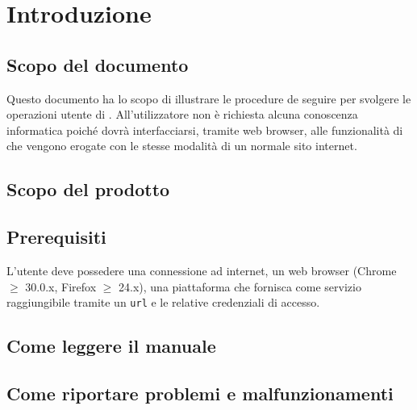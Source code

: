 \section{Introduzione}


\subsection{Scopo del documento}
Questo documento ha lo scopo di illustrare le procedure de seguire per svolgere le operazioni utente di . All'utilizzatore non è richiesta alcuna conoscenza informatica poiché dovrà interfacciarsi, tramite web browser, alle funzionalità di  che vengono erogate con le stesse modalità di un normale sito internet.

\subsection{Scopo del prodotto}
\ScopoDelProdotto{} 

\subsection{Prerequisiti}
L'utente deve possedere una connessione ad internet, un web browser (Chrome $\geq$ 30.0.x, Firefox $\geq$ 24.x), una piattaforma che fornisca  come servizio raggiungibile tramite un \texttt{url} e le relative credenziali di accesso.

\subsection{Come leggere il manuale}

\subsection{Come riportare problemi e malfunzionamenti}






